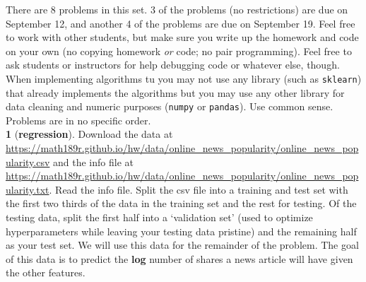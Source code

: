 \documentclass[12pt,letterpaper,fleqn]{hmcpset}
\begin{document}
There are 8 problems in this set. 3 of the problems (no restrictions) are due
on September 12, and another 4 of the problems are due on September 19. Feel
free to work with other students, but make sure you write up the homework
and code on your own (no copying homework \textit{or} code; no pair programming).
Feel free to ask students or instructors for help debugging code or whatever else,
though.
When implementing algorithms tu
you may not use any library (such as \texttt{sklearn})
that already implements the algorithms but you may use any other library for
data cleaning and numeric purposes (\texttt{numpy} or \texttt{pandas}). Use common
sense. Problems are in no specific order.\\[1em]


\textbf{1} (\textbf{regression}). Download the data at 
\url{https://math189r.github.io/hw/data/online_news_popularity/online_news_popularity.csv}
and the info file at
\url{https://math189r.github.io/hw/data/online_news_popularity/online_news_popularity.txt}.
Read the info file. Split the csv file into a training and test set with
the first two thirds of the data in the training set and the rest for testing.
Of the testing data, split the first half into a `validation set' (used
to optimize hyperparameters while leaving your testing data pristine) and
the remaining half as your test set.
We will use this data for the remainder of the problem. The goal of this data
is to predict the \textbf{log} number of shares a news article will have given the other
features.
\end{document}
